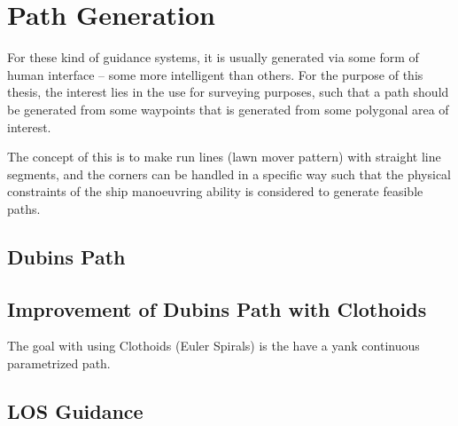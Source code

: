 \chapter{Path Generation}

For these kind of guidance systems, it is usually generated via some
form of human interface -- some more intelligent than others. For the
purpose of this thesis, the interest lies in the use for surveying
purposes, such that a path should be generated from some waypoints
that is generated from some polygonal area of interest.

The concept of this is to make run lines (lawn mover pattern) with
straight line segments, and the corners can be handled in a specific
way such that the physical constraints of the ship manoeuvring ability
is considered to generate feasible paths.

\section{Dubins Path}



\section{Improvement of Dubins Path with Clothoids}
The goal with using Clothoids (Euler Spirals) is the have a yank
continuous parametrized path.

\section{\acs{LOS} Guidance}

